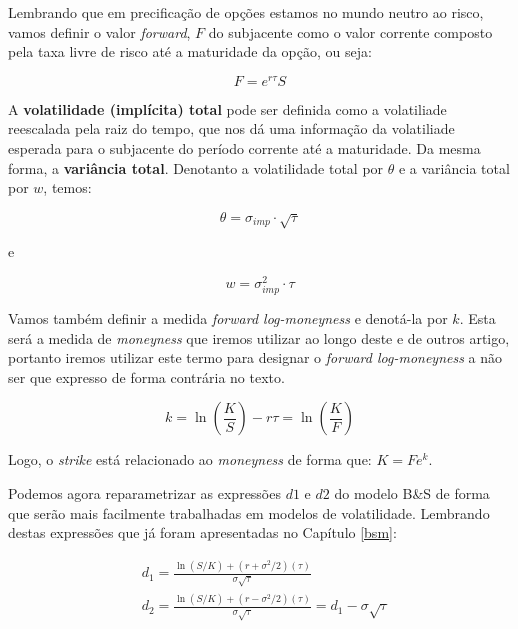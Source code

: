 \documentclass[]{book}
\theoremstyle{definition}
\theoremstyle{definition}
\theoremstyle{definition}
\theoremstyle{remark}
\begin{document}
Lembrando que em precificação de opções estamos no mundo neutro ao risco, vamos definir o valor \emph{forward}, \(F\) do subjacente como o valor corrente composto pela taxa livre de risco até a maturidade da opção, ou seja:

\begin{equation}
F=e^{r\tau}S
\end{equation}

A \textbf{volatilidade (implícita) total} pode ser definida como a volatiliade reescalada pela raiz do tempo, que nos dá uma informação da volatiliade esperada para o subjacente do período corrente até a maturidade. Da mesma forma, a \textbf{variância total}. Denotanto a volatilidade total por \(\theta\) e a variância total por \(w\), temos:

\begin{equation}
\theta=\sigma_{imp}\cdot \sqrt{\tau} 
\label{eq:voltotal}
\end{equation}

e

\begin{equation}
w=\sigma_{imp}^2\cdot\tau
\label{eq:vartotal}
\end{equation}

Vamos também definir a medida \emph{forward log-moneyness} e denotá-la por \(k\). Esta será a medida de \emph{moneyness} que iremos utilizar ao longo deste e de outros artigo, portanto iremos utilizar este termo para designar o \emph{forward log-moneyness} a não ser que expresso de forma contrária no texto.

\begin{equation}
k=\ln\left(\frac{K}{S}\right)-r\tau=\ln\left(\frac{K}{F}\right)
\label{eq:flmoneyness}
\end{equation}

Logo, o \emph{strike} está relacionado ao \emph{moneyness} de forma que: \(K=Fe^k\).

Podemos agora reparametrizar as expressões \(d1\) e \(d2\) do modelo B\&S de forma que serão mais facilmente trabalhadas em modelos de volatilidade. Lembrando destas expressões que já foram apresentadas no Capítulo \ref{bsm}:

\begin{align}
&d_{1}={\frac {\ln(S/K)+(r+\sigma ^{2}/2)(\tau)}{\sigma {\sqrt {\tau}}}}\\
&d_{2}={\frac {\ln(S/K)+(r-\sigma ^{2}/2)(\tau)}{\sigma {\sqrt {\tau}}}}=d_1-\sigma\sqrt{\tau}
\end{align}
\end{document}
